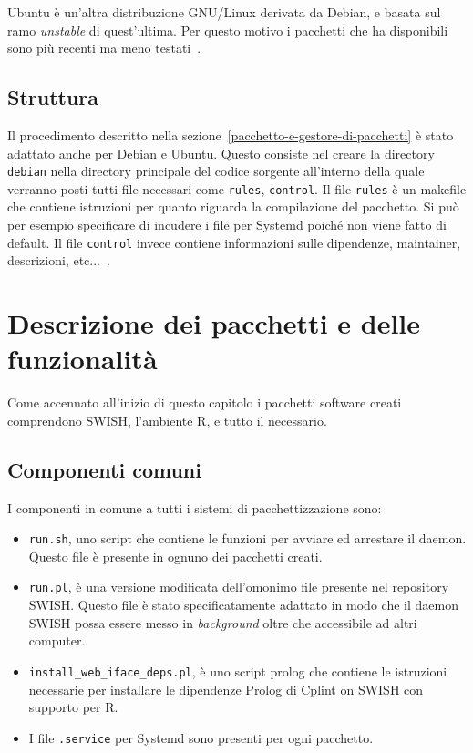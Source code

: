\documentclass[10pt,titlepage,twoside,a4paper]{report}
\begin{document}
Ubuntu è un'altra distribuzione GNU/Linux derivata da Debian, e basata sul ramo 
\emph{unstable} di quest'ultima. Per questo motivo i pacchetti che ha 
disponibili sono più recenti ma meno testati~\cite{ubuntu}.

\subsection{Struttura}
Il procedimento descritto nella sezione~\ref{pacchetto-e-gestore-di-pacchetti}
è stato adattato anche per Debian e Ubuntu. Questo consiste nel creare la 
directory \texttt{debian} nella directory principale del codice sorgente 
all'interno della quale verranno posti tutti file necessari come 
\texttt{rules}, \texttt{control}.  Il file \texttt{rules} è un makefile che 
contiene istruzioni per quanto riguarda la compilazione del pacchetto. Si può 
per esempio specificare di incudere i file per Systemd poiché non viene fatto 
di default. Il file \texttt{control} invece contiene informazioni sulle 
dipendenze, maintainer, descrizioni, etc...~\cite{debianPackaging}.


\section{Descrizione dei pacchetti e delle funzionalità}
Come accennato all'inizio di questo capitolo i pacchetti software creati 
comprendono SWISH, l'ambiente R, e tutto il necessario.

\subsection{Componenti comuni}
I componenti in comune a tutti i sistemi di pacchettizzazione sono:
\begin{itemize}
    \item \texttt{run.sh}, uno script che contiene le funzioni per avviare ed  
          arrestare il daemon. Questo file è presente in ognuno dei pacchetti
          creati.

    \item \texttt{run.pl}, è una versione modificata dell'omonimo file presente
          nel repository SWISH. Questo file è stato specificatamente adattato
          in modo che il daemon SWISH possa essere messo in 
          \emph{background} oltre che accessibile ad altri computer.

    \item \texttt{install\_web\_iface\_deps.pl}, è uno script prolog che 
contiene le istruzioni necessarie per installare le dipendenze Prolog di Cplint 
on SWISH con supporto per R.

    \item I file \texttt{.service} per Systemd sono presenti per ogni 
          pacchetto.
\end{itemize}
\end{document}
